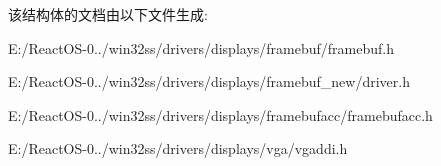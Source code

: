 该结构体的文档由以下文件生成\+:\begin{DoxyCompactItemize}
\item 
E\+:/\+React\+O\+S-\/0../win32ss/drivers/displays/framebuf/framebuf.\+h\item 
E\+:/\+React\+O\+S-\/0../win32ss/drivers/displays/framebuf\+\_\+new/driver.\+h\item 
E\+:/\+React\+O\+S-\/0../win32ss/drivers/displays/framebufacc/framebufacc.\+h\item 
E\+:/\+React\+O\+S-\/0../win32ss/drivers/displays/vga/vgaddi.\+h\end{DoxyCompactItemize}
